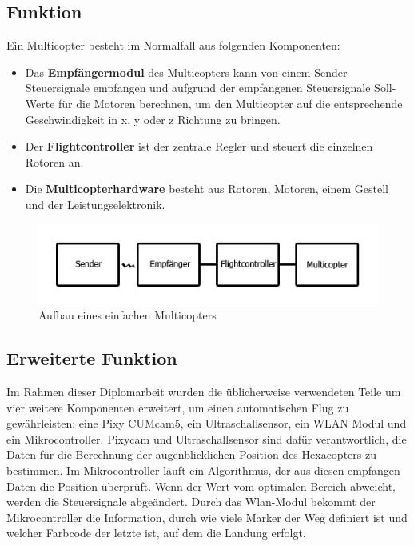   \subsection{Funktion}
  Ein Multicopter besteht im Normalfall aus folgenden Komponenten:
    \begin{itemize}
   \item Das \textbf{Empfängermodul} des Multicopters kann von einem Sender Steuersignale empfangen und aufgrund der empfangenen Steuersignale Soll-Werte für die Motoren berechnen, um den Multicopter auf die entsprechende Geschwindigkeit in x, y oder z Richtung zu bringen.
   \item Der \textbf{Flightcontroller} ist der zentrale Regler und steuert die einzelnen Rotoren an.
   \item Die \textbf{Multicopterhardware} besteht aus Rotoren, Motoren, einem Gestell und der Leistungselektronik. 
   \end{itemize}


    \begin{figure}[H]
    \begin{centering}
      \includegraphics[width = \textwidth]{Bilder/bor_copter_funk}
    \par\end{centering}
    \caption{Aufbau eines einfachen Multicopters}
    \label{Funktion_Multicopter}
  \end{figure}

   \subsection{Erweiterte Funktion}
    Im Rahmen dieser Diplomarbeit wurden die üblicherweise verwendeten Teile um vier weitere Komponenten erweitert, um einen automatischen Flug zu gewährleisten: eine Pixy CUMcam5, ein Ultraschallsensor, ein WLAN Modul und ein Mikrocontroller. Pixycam und Ultraschallsensor sind dafür verantwortlich, die Daten für die Berechnung der augenblicklichen Position des Hexacopters zu bestimmen. Im Mikrocontroller läuft ein Algorithmus, der aus diesen empfangen Daten die Position überprüft. Wenn der Wert vom optimalen Bereich abweicht, werden die Steuersignale abgeändert. Durch das Wlan-Modul bekommt der Mikrocontroller die Information, durch wie viele Marker der Weg definiert ist und welcher Farbcode der letzte ist, auf dem die Landung erfolgt.


